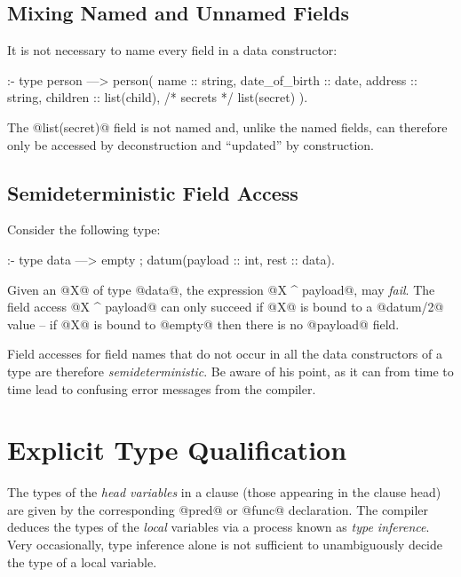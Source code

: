 \subsection{Mixing Named and Unnamed Fields}

It is not necessary to name every field in a data constructor:
\begin{myverbatim}
:- type person
    --->    person(
                name            :: string,
                date_of_birth   :: date,
                address         :: string,
                children        :: list(child),
                /* secrets */      list(secret)
            ).
\end{myverbatim}
The @list(secret)@ field is not named and, unlike the named fields, can
therefore only be accessed by deconstruction and ``updated'' by
construction.

\subsection{Semideterministic Field Access}

Consider the following type:
\begin{myverbatim}
:- type data ---> empty ; datum(payload :: int, rest :: data).
\end{myverbatim}
Given an @X@ of type @data@, the expression @X ^ payload@, may
\emph{fail}.  The field access @X ^ payload@ can only succeed if @X@ is
bound to a @datum/2@ value -- if @X@ is bound to @empty@ then there is no
@payload@ field.

Field accesses for field names that do not occur in all the data
constructors of a type are therefore \emph{semideterministic}.  Be aware of
his point, as it can from time to time lead to confusing error messages from
the compiler.


\section{Explicit Type Qualification}

The types of the \emph{head variables} in a clause (\ie those appearing in
the clause head) are given by the corresponding @pred@ or @func@
declaration.  The compiler deduces the types of the \emph{local} variables
via a process known as \emph{type inference}.  Very occasionally, type
inference alone is not sufficient to unambiguously decide the type of a
local variable.

